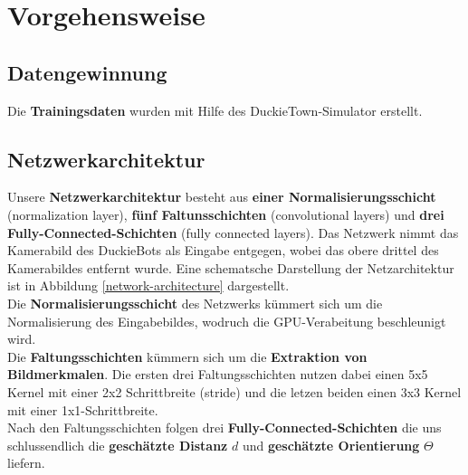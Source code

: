 
\chapter{Vorgehensweise}

\section{Datengewinnung}

Die \textbf{Trainingsdaten} wurden mit Hilfe des DuckieTown-Simulator erstellt.

\section{Netzwerkarchitektur}

Unsere \textbf{Netzwerkarchitektur} besteht aus \textbf{einer Normalisierungsschicht} (normalization layer), \textbf{fünf Faltunsschichten} (convolutional layers) und \textbf{drei Fully-Connected-Schichten} (fully connected layers). Das Netzwerk nimmt das  Kamerabild des DuckieBots als Eingabe entgegen, wobei das obere drittel des Kamerabildes entfernt wurde. Eine schematsche Darstellung der Netzarchitektur ist in Abbildung \ref{network-architecture} dargestellt. \\

Die \textbf{Normalisierungsschicht} des Netzwerks kümmert sich um die Normalisierung des Eingabebildes, wodruch die GPU-Verabeitung beschleunigt wird. \\

Die \textbf{Faltungsschichten} kümmern sich um die \textbf{Extraktion von Bildmerkmalen}. Die ersten drei Faltungsschichten nutzen dabei einen 5x5 Kernel mit einer 2x2 Schrittbreite (stride) und die letzen beiden einen 3x3 Kernel mit einer 1x1-Schrittbreite. \\

Nach den Faltungsschichten folgen drei \textbf{Fully-Connected-Schichten} die uns schlussendlich die \textbf{geschätzte Distanz} $d$ und \textbf{geschätzte Orientierung} $\Theta$ liefern.


